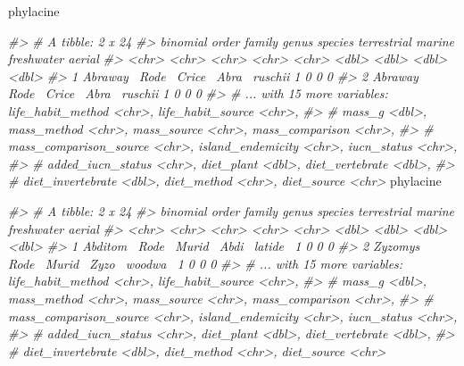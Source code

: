 \documentclass[]{book}
\newenvironment{Shaded}{}{}
\newcommand{\CommentTok}[1]{\textcolor[rgb]{0.38,0.63,0.69}{\textit{#1}}}
\newcommand{\DecValTok}[1]{\textcolor[rgb]{0.25,0.63,0.44}{#1}}
\newcommand{\KeywordTok}[1]{\textcolor[rgb]{0.00,0.44,0.13}{\textbf{#1}}}
\newcommand{\NormalTok}[1]{#1}
\newcommand{\OperatorTok}[1]{\textcolor[rgb]{0.40,0.40,0.40}{#1}}
\newcommand{\StringTok}[1]{\textcolor[rgb]{0.25,0.44,0.63}{#1}}
\begin{document}
\begin{Shaded}
\begin{Highlighting}[]
{{\NormalTok{phylacine }\OperatorTok{%
\CommentTok{#> # A tibble: 2 x 24}
\CommentTok{#>   binomial order family genus species terrestrial marine freshwater aerial}
\CommentTok{#>   <chr>    <chr> <chr>  <chr> <chr>         <dbl>  <dbl>      <dbl>  <dbl>}
\CommentTok{#> 1 Abraway~ Rode~ Crice~ Abra~ ruschii           1      0          0      0}
\CommentTok{#> 2 Abraway~ Rode~ Crice~ Abra~ ruschii           1      0          0      0}
\CommentTok{#> # ... with 15 more variables: life_habit_method <chr>, life_habit_source <chr>,}
\CommentTok{#> #   mass_g <dbl>, mass_method <chr>, mass_source <chr>, mass_comparison <chr>,}
\CommentTok{#> #   mass_comparison_source <chr>, island_endemicity <chr>, iucn_status <chr>,}
\CommentTok{#> #   added_iucn_status <chr>, diet_plant <dbl>, diet_vertebrate <dbl>,}
\CommentTok{#> #   diet_invertebrate <dbl>, diet_method <chr>, diet_source <chr>}
\NormalTok{phylacine }\OperatorTok{%
\CommentTok{#> # A tibble: 2 x 24}
\CommentTok{#>   binomial order family genus species terrestrial marine freshwater aerial}
\CommentTok{#>   <chr>    <chr> <chr>  <chr> <chr>         <dbl>  <dbl>      <dbl>  <dbl>}
\CommentTok{#> 1 Abditom~ Rode~ Murid~ Abdi~ latide~           1      0          0      0}
\CommentTok{#> 2 Zyzomys~ Rode~ Murid~ Zyzo~ woodwa~           1      0          0      0}
\CommentTok{#> # ... with 15 more variables: life_habit_method <chr>, life_habit_source <chr>,}
\CommentTok{#> #   mass_g <dbl>, mass_method <chr>, mass_source <chr>, mass_comparison <chr>,}
\CommentTok{#> #   mass_comparison_source <chr>, island_endemicity <chr>, iucn_status <chr>,}
\CommentTok{#> #   added_iucn_status <chr>, diet_plant <dbl>, diet_vertebrate <dbl>,}
\CommentTok{#> #   diet_invertebrate <dbl>, diet_method <chr>, diet_source <chr>}

}}}}
\end{Highlighting}
\end{Shaded}
\end{document}
